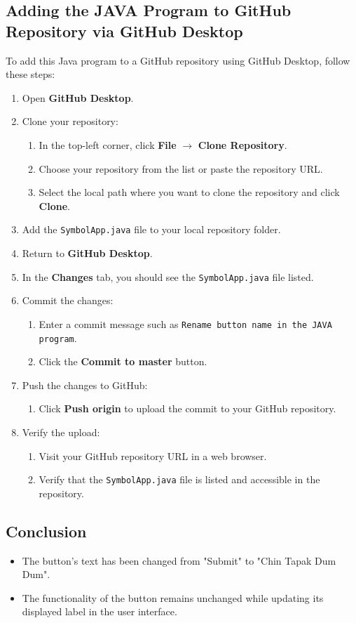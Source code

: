 \subsection{Adding the JAVA Program to GitHub Repository via GitHub Desktop}
To add this Java program to a GitHub repository using GitHub Desktop, follow these steps:
\begin{enumerate}
    \item Open \textbf{GitHub Desktop}.
    \item Clone your repository:
    \begin{enumerate}
        \item In the top-left corner, click \textbf{File} \(\rightarrow\) \textbf{Clone Repository}.
        \item Choose your repository from the list or paste the repository URL.
        \item Select the local path where you want to clone the repository and click \textbf{Clone}.
    \end{enumerate}
    \item Add the \texttt{SymbolApp.java} file to your local repository folder.
    \item Return to \textbf{GitHub Desktop}.
    \item In the \textbf{Changes} tab, you should see the \texttt{SymbolApp.java} file listed.
    \item Commit the changes:
    \begin{enumerate}
        \item Enter a commit message such as \texttt{Rename button name in the JAVA program}.
        \item Click the \textbf{Commit to master} button.
    \end{enumerate}
    \item Push the changes to GitHub:
    \begin{enumerate}
        \item Click \textbf{Push origin} to upload the commit to your GitHub repository.
    \end{enumerate}
    \item Verify the upload:
    \begin{enumerate}
        \item Visit your GitHub repository URL in a web browser.
        \item Verify that the \texttt{SymbolApp.java} file is listed and accessible in the repository.
    \end{enumerate}
\end{enumerate}


\subsection{Conclusion}
\begin{itemize}
    \item The button's text has been changed from "Submit" to "Chin Tapak Dum Dum".
    \item The functionality of the button remains unchanged while updating its displayed label in the user interface.
\end{itemize}
